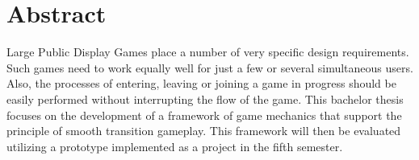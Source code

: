 \chapter{Abstract}

\begin{english}
Large Public Display Games place a number of very specific design requirements. Such games need to work equally well for just a few or several simultaneous users. Also, the processes of entering, leaving or joining a game in progress should be easily performed without interrupting the flow of the game. This bachelor thesis focuses on the development of a framework of game mechanics that support the principle of smooth transition gameplay. This framework will then be evaluated utilizing a prototype implemented as a project in the fifth semester.
\end{english}
